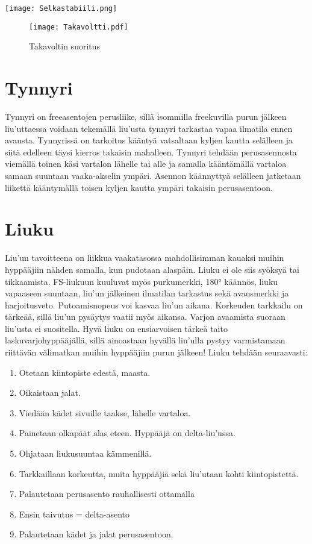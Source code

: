 \begin{Figure}\centering\texttt{[image: Selkastabiili.png]}\end{Figure} 


\begin{figure*}[]\centering\texttt{[image: Takavoltti.pdf]}\caption{Takavoltin suoritus}\end{figure*} 

\section{ Tynnyri }
\label{perusliikkeet-vapaassa-tynnyri}


Tynnyri on freeasentojen perusliike, sillä isommilla freekuvilla purun jälkeen liu’uttaessa voidaan tekemällä liu’usta tynnyri tarkastaa vapaa ilmatila ennen avausta. Tynnyrissä on tarkoitus kääntyä vatsaltaan kyljen kautta selälleen ja siitä edelleen täysi kierros takaisin mahalleen. Tynnyri tehdään perusasennosta viemällä toinen käsi vartalon lähelle tai alle ja samalla kääntämällä vartaloa samaan suuntaan vaaka-akselin ympäri. Asennon käännyttyä selälleen jatketaan liikettä kääntymällä toisen kyljen kautta ympäri takaisin perusasentoon. 

\section{ Liuku }
\label{perusliikkeet-vapaassa-liuku}


Liu’un tavoitteena on liikkua vaakatasossa mahdollisimman kauaksi muihin hyppääjiin nähden samalla, kun pudotaan alaspäin. Liuku ei ole siis syöksyä tai tikkaamista. FS-liukuun kuuluvat myös purkumerkki, 180° käännös, liuku vapaaseen suuntaan, liu’un jälkeinen ilmatilan tarkastus sekä avausmerkki ja harjoitusveto. Putoamisnopeus voi kasvaa liu’un aikana. Korkeuden tarkkailu on tärkeää, sillä liu’un pysäytys vaatii myös aikansa. Varjon avaamista suoraan liu’usta ei suositella. Hyvä liuku on ensiarvoisen tärkeä taito laskuvarjohyppääjällä, sillä ainoastaan hyvällä liu’ulla pystyy varmistamaan riittävän välimatkan muihin hyppääjiin purun jälkeen!  Liuku tehdään seuraavasti: 

\begin{enumerate}[label=\bfseries \arabic*)]
\item  Otetaan kiintopiste edestä, maasta. 
\item  Oikaistaan jalat. 
\item  Viedään kädet sivuille taakse, lähelle vartaloa. 
\item  Painetaan olkapäät alas eteen. Hyppääjä on delta-liu’ussa. 
\item  Ohjataan liukusuuntaa kämmenillä. 
\item  Tarkkaillaan korkeutta, muita hyppääjiä sekä liu’utaan kohti kiintopistettä. 
\item  Palautetaan perusasento rauhallisesti ottamalla 
\item  Ensin taivutus = delta-asento 
\item  Palautetaan kädet ja jalat perusasentoon. 
\end{enumerate}

